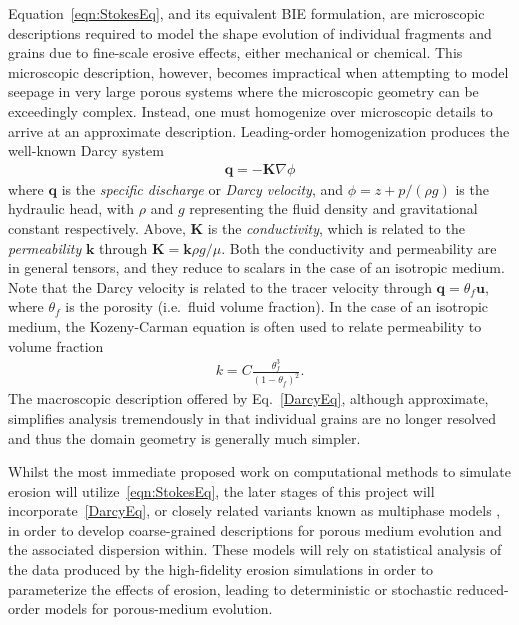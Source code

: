 \documentclass[11pt]{article}
\newcommand{\bvec}[1]{{\mathbf{#1}}}
\newcommand{\grad}{\nabla}
\newcommand{\uu}{\bvec{u}}
\newcommand {\qq} {\bvec{q}}
\begin{document}
Equation~\eqref{eqn:StokesEq}, and its equivalent BIE formulation, are microscopic descriptions required to model the shape evolution of individual fragments and grains due to fine-scale erosive effects, either mechanical or chemical. This microscopic description, however, becomes impractical when attempting to model seepage in very large porous systems where the microscopic geometry can be exceedingly complex. Instead, one must homogenize over microscopic details to arrive at an approximate description. Leading-order homogenization produces the well-known Darcy system 
\begin{align}
  \label{DarcyEq}
  \qq = - \bvec{K} \grad \phi
\end{align}
where $\qq$ is the {\em specific discharge} or {\em Darcy velocity}, and $\phi = z + p/(\rho g)$ is the hydraulic head, with $\rho$ and $g$ representing the fluid density and gravitational constant respectively.  Above, $\bvec{K}$ is the {\em conductivity}, which is related to the {\em permeability} $\bvec{k}$ through $\bvec{K} = \bvec{k} \rho g/\mu$.  Both the conductivity and permeability are in general tensors, and they reduce to scalars in the case of an isotropic medium. Note that the Darcy velocity is related to the tracer velocity through $\qq = \theta_f \uu$, where $\theta_f$ is the porosity (i.e.~fluid volume fraction).  In the case of an isotropic medium, the Kozeny-Carman equation is often used to relate permeability to volume fraction~\cite{bear2013dynamics}
\begin{align}
  k = C \frac{\theta_f^3}{(1-\theta_f)^2}.
\end{align}
The macroscopic description offered by Eq.~\eqref{DarcyEq}, although approximate, simplifies analysis tremendously in that individual grains are no longer resolved and thus the domain geometry is generally much simpler.

Whilst the most immediate proposed work on computational methods to simulate erosion will utilize~\eqref{eqn:StokesEq}, the later stages of this project will incorporate~\eqref{DarcyEq}, or closely related variants known as multiphase models \cite{breward2003multiphase, cogan2010multiphase, Imma2019, eastham2019multiphase}, in order to develop coarse-grained descriptions for porous medium evolution and the associated dispersion within. These models will rely on statistical analysis of the data produced by the high-fidelity erosion simulations in order to parameterize the effects of erosion, leading to deterministic or stochastic reduced-order models for porous-medium evolution. 
\end{document}
